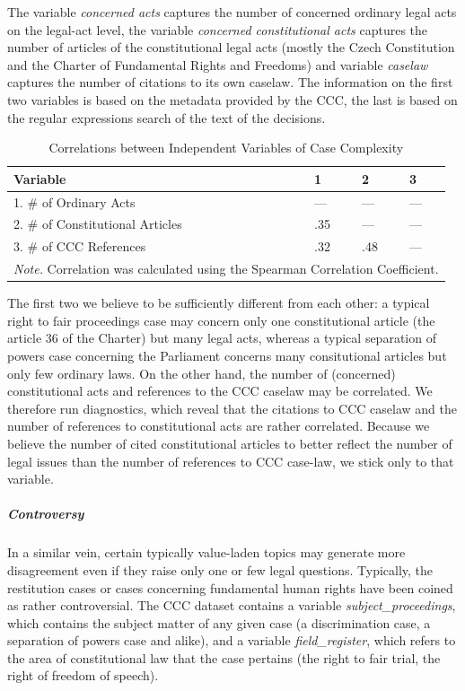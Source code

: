 \documentclass[
  11pt,
]{article}
\begin{document}
The variable \emph{concerned acts} captures the number of concerned
ordinary legal acts on the legal-act level, the variable \emph{concerned
constitutional acts} captures the number of articles of the
constitutional legal acts (mostly the Czech Constitution and the Charter
of Fundamental Rights and Freedoms) and variable \emph{caselaw} captures
the number of citations to its own caselaw. The information on the first
two variables is based on the metadata provided by the CCC, the last is
based on the regular expressions search of the text of the decisions.

\begin{longtable}[t]{llll}
\caption{\label{tab:unnamed-chunk-3}Correlations between Independent Variables of Case Complexity}\\
\toprule
\textbf{Variable} & \textbf{1} & \textbf{2} & \textbf{3}\\
\midrule
1. \# of Ordinary Acts & — & — & —\\
2. \# of Constitutional Articles & .35 & — & —\\
3. \# of CCC References & .32 & .48 & —\\
\bottomrule
\multicolumn{4}{l}{\rule{0pt}{1em}\textit{Note.} Correlation was calculated using the Spearman Correlation Coefficient.}\\
\end{longtable}

The first two we believe to be sufficiently different from each other: a
typical right to fair proceedings case may concern only one
constitutional article (the article 36 of the Charter) but many legal
acts, whereas a typical separation of powers case concerning the
Parliament concerns many consitutional articles but only few ordinary
laws. On the other hand, the number of (concerned) constitutional acts
and references to the CCC caselaw may be correlated. We therefore run
diagnostics, which reveal that the citations to CCC caselaw and the
number of references to constitutional acts are rather correlated.
Because we believe the number of cited constitutional articles to better
reflect the number of legal issues than the number of references to CCC
case-law, we stick only to that variable.

\hypertarget{controversy}{%
\subparagraph{Controversy}\label{controversy}}

In a similar vein, certain typically value-laden topics may generate
more disagreement even if they raise only one or few legal questions.
Typically, the restitution cases or cases concerning fundamental human
rights have been coined as rather controversial. The CCC dataset
contains a variable \emph{subject\_proceedings}, which contains the
subject matter of any given case (a discrimination case, a separation of
powers case and alike), and a variable \emph{field\_register}, which
refers to the area of constitutional law that the case pertains (the
right to fair trial, the right of freedom of speech).
\end{document}
